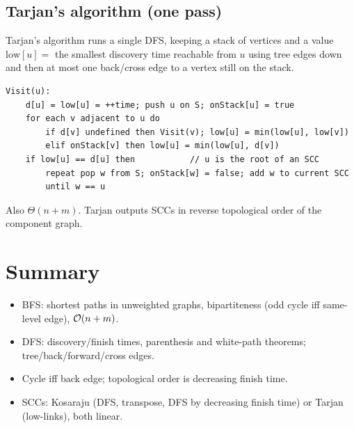 \subsection{Tarjan's algorithm (one pass)}
Tarjan's algorithm runs a single DFS, keeping a stack of vertices and a value
$\mathrm{low}[u]=$ the smallest discovery time reachable from $u$ using tree edges down and then at most one back/cross edge to a vertex still on the stack.
\begin{lstlisting}[style=pseudo]
Visit(u):
    d[u] = low[u] = ++time; push u on S; onStack[u] = true
    for each v adjacent to u do
        if d[v] undefined then Visit(v); low[u] = min(low[u], low[v])
        elif onStack[v] then low[u] = min(low[u], d[v])
    if low[u] == d[u] then           // u is the root of an SCC
        repeat pop w from S; onStack[w] = false; add w to current SCC
        until w == u
\end{lstlisting}
Also $\Theta(n+m)$. Tarjan outputs SCCs in reverse topological order of the component graph.

\section*{Summary}
\begin{itemize}
  \item BFS: shortest paths in unweighted graphs, bipartiteness (odd cycle iff same-level edge), $\mathcal{O}(n+m)$.
  \item DFS: discovery/finish times, parenthesis and white-path theorems; tree/back/forward/cross edges.
  \item Cycle iff back edge; topological order is decreasing finish time.
  \item SCCs: Kosaraju (DFS, transpose, DFS by decreasing finish time) or Tarjan (low-links), both linear.
\end{itemize}
